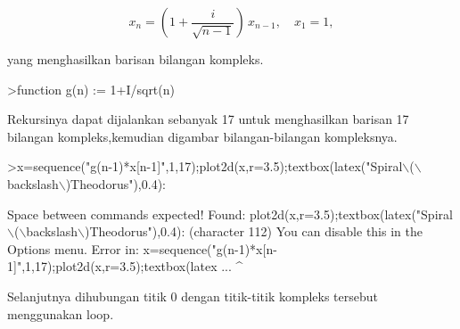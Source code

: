 \documentclass[12pt,Times new roman,letterpaper]{book}
\begin{document}
\begin{eulernootebook}
\begin{eulercomment}
\begin{eulercomment}
\begin{eulernootebook}
\begin{eulercomment}
\begin{eulercomment}
\begin{eulercomment}
\begin{eulercomment}
\begin{eulercomment}
\begin{eulercomment}
\begin{eulernotebook}
\begin{eulercomment}
\begin{eulercomment}
\begin{eulercomment}
\begin{eulercomment}
\begin{eulercomment}
\begin{eulercomment}
\begin{eulercomment}
\begin{eulercomment}
\begin{eulercomment}
\begin{eulercomment}
\begin{eulercomment}
\begin{eulercomment}
\begin{eulercomment}
\begin{eulercomment}
\begin{eulercomment}
\begin{eulercomment}
\begin{eulercomment}
\begin{eulercomment}
\begin{eulercomment}
\begin{eulercomment}
\begin{eulercomment}
\begin{eulercomment}
\begin{eulercomment}
\begin{eulercomment}
\begin{eulercomment}
\begin{eulercomment}
\begin{eulercomment}
\begin{eulercomment}
\begin{eulercomment}
\end{eulercomment}
\begin{eulerformula}
\[
x_n = \left( 1 + \frac{i}{\sqrt{n-1}} \right) \, x_{n-1}, \quad x_1=1,
\]
\end{eulerformula}
\begin{eulercomment}
yang menghasilkan barisan bilangan kompleks.
\end{eulercomment}
\begin{eulerprompt}
>function g(n) := 1+I/sqrt(n)
\end{eulerprompt}
\begin{eulercomment}
Rekursinya dapat dijalankan sebanyak 17 untuk menghasilkan barisan 17
bilangan kompleks,kemudian digambar bilangan-bilangan kompleksnya.
\end{eulercomment}
\begin{eulerprompt}
>x=sequence("g(n-1)*x[n-1]",1,17);plot2d(x,r=3.5);textbox(latex("Spiral\(\backslash\)(\(\backslash\)backslash\(\backslash\))Theodorus"),0.4):
\end{eulerprompt}
\begin{euleroutput}
  Space between commands expected!
  Found: plot2d(x,r=3.5);textbox(latex("Spiral\(\backslash\)(\(\backslash\)backslash\(\backslash\))Theodorus"),0.4): (character 112)
  You can disable this in the Options menu.
  Error in:
  x=sequence("g(n-1)*x[n-1]",1,17);plot2d(x,r=3.5);textbox(latex ...
                                   ^
\end{euleroutput}
\begin{eulercomment}
Selanjutnya dihubungan titik 0 dengan titik-titik kompleks tersebut
menggunakan loop.
\end{eulercomment}

\end{eulercomment}
\end{eulercomment}
\end{eulercomment}
\end{eulercomment}
\end{eulercomment}
\end{eulercomment}
\end{eulercomment}
\end{eulercomment}
\end{eulercomment}
\end{eulercomment}
\end{eulercomment}
\end{eulercomment}
\end{eulercomment}
\end{eulercomment}
\end{eulercomment}
\end{eulercomment}
\end{eulercomment}
\end{eulercomment}
\end{eulercomment}
\end{eulercomment}
\end{eulercomment}
\end{eulercomment}
\end{eulercomment}
\end{eulercomment}
\end{eulercomment}
\end{eulercomment}
\end{eulercomment}
\end{eulercomment}
\end{eulernotebook}
\end{eulercomment}
\end{eulercomment}
\end{eulercomment}
\end{eulercomment}
\end{eulercomment}
\end{eulercomment}
\end{eulernootebook}
\end{eulercomment}
\end{eulercomment}
\end{eulernootebook}
\end{document}
